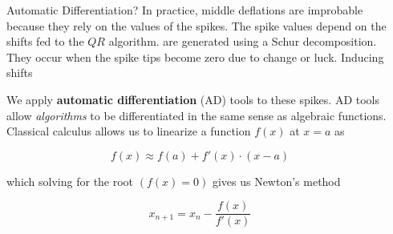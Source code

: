 \documentclass[final]{beamer}
\newlength{\onecolwid}
\newlength{\twocolwid}
\begin{document}
\begin{frame}[t]
\begin{columns}[t]
\begin{column}{\twocolwid}
\begin{columns}[t,totalwidth=\twocolwid]
\begin{column}{\onecolwid}

\end{column} %

\begin{column}{\onecolwid}\vspace{-.6in} %


\begin{block}{Automatic Differentiation?}
In practice, middle deflations are improbable because they rely on the values
of the spikes. The spike values depend on the shifts fed to the $Q R$ algorithm. 
are generated using a Schur decomposition.
They occur when the spike tips become zero due to change or luck. Inducing shifts

\vspace{0.5ex}
\begin{figure}
\end{figure}
\vspace{0.5ex}

We apply \textbf{automatic differentiation} (AD) tools to these spikes. AD tools
allow \emph{algorithms} to be differentiated in the same sense as algebraic
functions. Classical calculus allows us to linearize a function $f(x)$ at $x=a$ as

\begin{equation*}
  f(x) \approx f(a) + f'(x) \cdot (x - a)
\end{equation*}

which solving for the root $(f(x) = 0)$ gives us Newton's method 

\begin{equation}
x_{n+1} = x_n - \frac{f(x)}{f'(x)}
\end{equation}


\end{block}
\end{column}
\end{columns}
\end{column}
\end{columns}
\end{frame}
\end{document}
